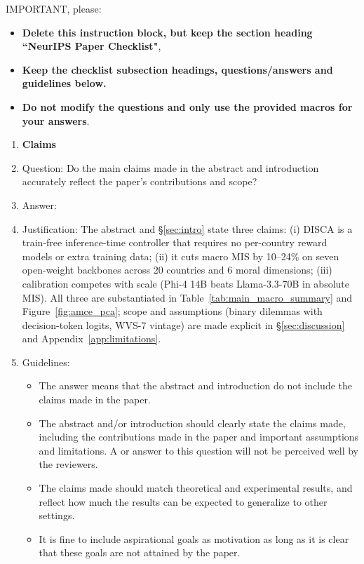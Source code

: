 IMPORTANT, please:
\begin{itemize}
    \item {\bf Delete this instruction block, but keep the section heading ``NeurIPS Paper Checklist"},
    \item  {\bf Keep the checklist subsection headings, questions/answers and guidelines below.}
    \item {\bf Do not modify the questions and only use the provided macros for your answers}.
\end{itemize} 
 



\begin{enumerate}

\item {\bf Claims}
    \item[] Question: Do the main claims made in the abstract and introduction accurately reflect the paper's contributions and scope?
    \item[] Answer: \answerYes{}
    \item[] Justification: The abstract and \S\ref{sec:intro} state three claims: (i) DISCA is a train-free inference-time controller that requires no per-country reward models or extra training data; (ii) it cuts macro MIS by 10--24\% on seven open-weight backbones across 20 countries and 6 moral dimensions; (iii) calibration competes with scale (Phi-4 14B beats Llama-3.3-70B in absolute MIS). All three are substantiated in Table~\ref{tab:main_macro_summary} and Figure~\ref{fig:amce_pca}; scope and assumptions (binary dilemmas with decision-token logits, WVS-7 vintage) are made explicit in \S\ref{sec:discussion} and Appendix~\ref{app:limitations}.
    \item[] Guidelines:
    \begin{itemize}
        \item The answer \answerNA{} means that the abstract and introduction do not include the claims made in the paper.
        \item The abstract and/or introduction should clearly state the claims made, including the contributions made in the paper and important assumptions and limitations. A \answerNo{} or \answerNA{} answer to this question will not be perceived well by the reviewers. 
        \item The claims made should match theoretical and experimental results, and reflect how much the results can be expected to generalize to other settings. 
        \item It is fine to include aspirational goals as motivation as long as it is clear that these goals are not attained by the paper. 
    \end{itemize}


\end{enumerate}
